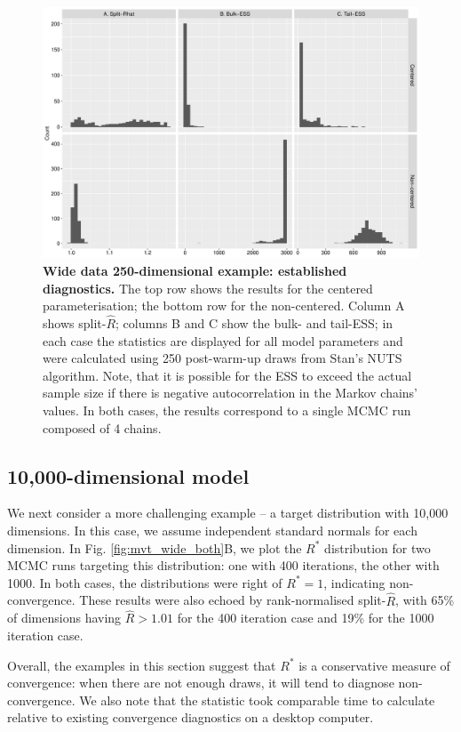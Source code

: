 \documentclass{article}
\begin{document}
\begin{figure}[!htb]
	\centerline{\includegraphics[width=1\textwidth]{../output/wide_both_diagnostics.pdf}}
	\caption{\textbf{Wide data 250-dimensional example: established diagnostics.} The top row shows the results for the centered parameterisation; the bottom row for the non-centered. Column A shows split-$\widehat{R}$; columns B and C show the bulk- and tail-ESS; in each case the statistics are displayed for all model parameters and were calculated using 250 post-warm-up draws from Stan's NUTS algorithm. Note, that it is possible for the ESS to exceed the actual sample size if there is negative autocorrelation in the Markov chains' values. In both cases, the results correspond to a single MCMC run composed of 4 chains.}
	\label{fig:wide_both_diagnostics}
\end{figure}

\subsection{10,000-dimensional model}
We next consider a more challenging example -- a target distribution with 10,000 dimensions. In this case, we assume independent standard normals for each dimension. In Fig. \ref{fig:mvt_wide_both}B, we plot the $R^*$ distribution for two MCMC runs targeting this distribution: one with 400 iterations, the other with 1000. In both cases, the distributions were right of $R^*=1$, indicating non-convergence. These results were also echoed by rank-normalised split-$\widehat{R}$, with 65\% of dimensions having $\widehat{R}>1.01$ for the 400 iteration case and 19\% for the 1000 iteration case.

Overall, the examples in this section suggest that $R^*$ is a conservative measure of convergence: when there are not enough draws, it will tend to diagnose non-convergence. We also note that the statistic took comparable time to calculate relative to existing convergence diagnostics on a desktop computer.
	
\end{document}
